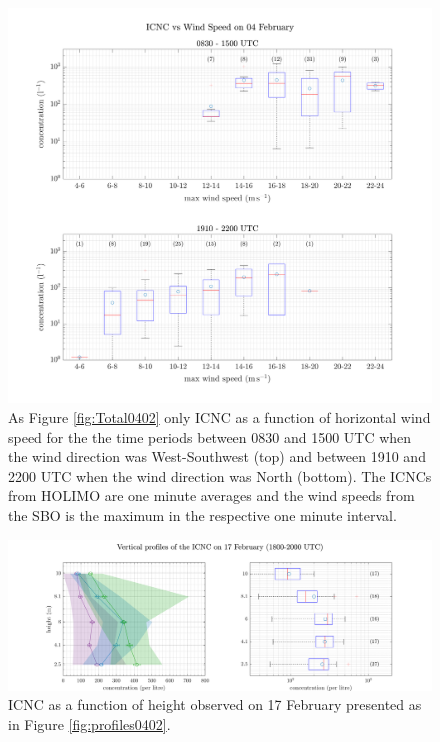 \documentclass[draft,linenumbers]{agujournal}
\begin{document}
\begin{figure}[t]
 \centering
 	\includegraphics[width=14cm]{0402_OverviewWS.png}
 \caption{As Figure \ref{fig:Total0402} only ICNC as a function of horizontal wind speed for the the time periods between 0830 and 1500 UTC when the wind direction was West-Southwest (top) and between 1910 and 2200 UTC when the wind direction was North (bottom). The ICNCs from HOLIMO are one minute averages and the wind speeds from the SBO is the maximum in the respective one minute interval.}
 \label{fig:ICNCvsWSMAX0402}
\end{figure}

\begin{figure}[t]
 \centering
 	\includegraphics[width=14cm]{1702_Overview.png}
 \caption{ICNC as a function of height observed on 17 February presented as in Figure \ref{fig:profiles0402}.}
 \label{fig:profiles1702}
\end{figure}
\end{document}

